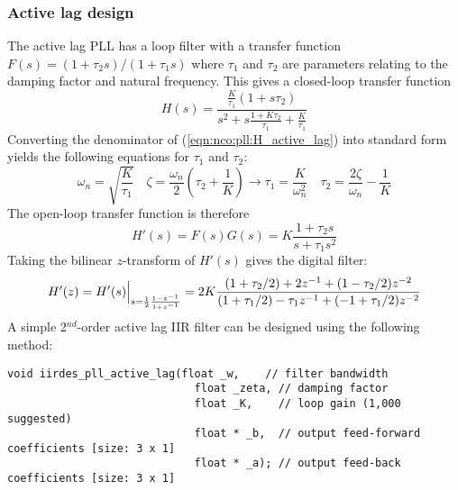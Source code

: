 \subsubsection{Active lag design}
\label{module:nco:pll:active_lag}
The active lag PLL \cite{Best:1997} has a loop filter with a transfer
function
$F(s) = (1 + \tau_2 s)/(1 + \tau_1 s)$
where $\tau_1$ and $\tau_2$ are parameters relating to the damping
factor and natural frequency.
%
This gives a closed-loop transfer function
%
\begin{equation}
\label{eqn:nco:pll:H_active_lag}
    H(s) = \frac{
                \frac{K}{\tau_1} (1 + s\tau_2)
           } {
                s^2 + s\frac{1 + K\tau_2}{\tau_1} + \frac{K}{\tau_1}
           }
\end{equation}
%
Converting the denominator of (\ref{eqn:nco:pll:H_active_lag}) into
standard form yields the following equations for $\tau_1$ and $\tau_2$:
%
\begin{equation}
    \omega_n = \sqrt{\frac{K}{\tau_1}}
    \,\,\,\,\,\,
    \zeta = \frac{\omega_n}{2}\left(\tau_2 + \frac{1}{K}\right)
        \rightarrow
    \tau_1 = \frac{K}{\omega_n^2}
    \,\,\,\,\,\,
    \tau_2 = \frac{2\zeta}{\omega_n} - \frac{1}{K}
\end{equation}
%
The open-loop transfer function is therefore
\begin{equation}
    H'(s) = F(s)G(s) = K \frac{1 + \tau_2 s}{s + \tau_1 s^2}
\end{equation}
%
Taking the bilinear $z$-transform of $H'(s)$ gives the digital filter:
%
\begin{equation}
    H'(z) = H'(s)\Bigl.\Bigr|_{s = \frac{1}{2}\frac{1-z^{-1}}{1+z^{-1}}}
          = 2 K \frac{
                (1+\tau_2/2) + 2 z^{-1}     + ( 1 - \tau_2/2)z^{-2}
          } {
                (1+\tau_1/2) -\tau_1 z^{-1} + (-1 + \tau_1/2)z^{-2}
          }
\end{equation}
%
A simple 2$^{nd}$-order active lag IIR filter can be designed using the
following method:
%
\begin{Verbatim}[fontsize=\small]
  void iirdes_pll_active_lag(float _w,    // filter bandwidth
                             float _zeta, // damping factor
                             float _K,    // loop gain (1,000 suggested)
                             float * _b,  // output feed-forward coefficients [size: 3 x 1]
                             float * _a); // output feed-back coefficients [size: 3 x 1]
\end{Verbatim}
%



